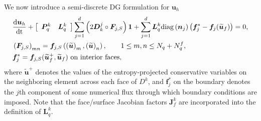 \documentclass[10pt]{amsart}
\theoremstyle{definition}
\theoremstyle{lemma}
\theoremstyle{theorem}
\theoremstyle{assumption}
\renewcommand{\tilde}{\widetilde}
\newcommand{\td}[2]{\frac{{\rm d}#1}{{\rm d}{\rm #2}}}
\newcommand{\LRp}[1]{\left( #1 \right)}
\newcommand{\LRs}[1]{\left[ #1 \right]}
\newcommand{\diag}[1]{{\rm diag}\LRp{#1}}
\begin{document}
{We now introduce a semi-discrete DG formulation for $\bm{u}_h$
\begin{align}
&\td{\bm{u}_h}{t} + \LRs{\begin{array}{cc}\bm{P}^k_q & \bm{L}^k_q\end{array}}
  \sum_{j=1}^d \LRp{2\bm{D}^j_k \circ \bm{F}_{j,S}}\bm{1} + \sum_{j=1}^d \bm{L}^k_q \diag{\bm{n}_j}\LRp{\bm{f}_j^* - \bm{f}_j(\tilde{\bm{u}}_f)} = 0,\label{eq:dgform1}\\
  &\LRp{\bm{F}_{j,S}}_{mn} = \bm{f}_{j,S}\LRp{\LRp{\tilde{\bm{u}}}_m,\LRp{\tilde{\bm{u}}}_n}, \qquad 1 \leq m,n \leq N_q + N^f_q,\nonumber\\
  &\bm{f}_j^* = \bm{f}_{j,S}(\tilde{\bm{u}}_f^+,\tilde{\bm{u}}_f) \text{ on interior faces},\nonumber
\end{align}
where $\tilde{\bm{u}}^+$ denotes the values of the entropy-projected conservative variables on the neighboring element across each face of $D^k$, and $\bm{f}_j^*$ on the boundary denotes the $j$th component of some numerical flux through which boundary conditions are imposed.  Note that the face/surface Jacobian factors $\bm{J}^k_f$ are incorporated into the definition of $\bm{L}^k_q$.  

}
\end{document}
